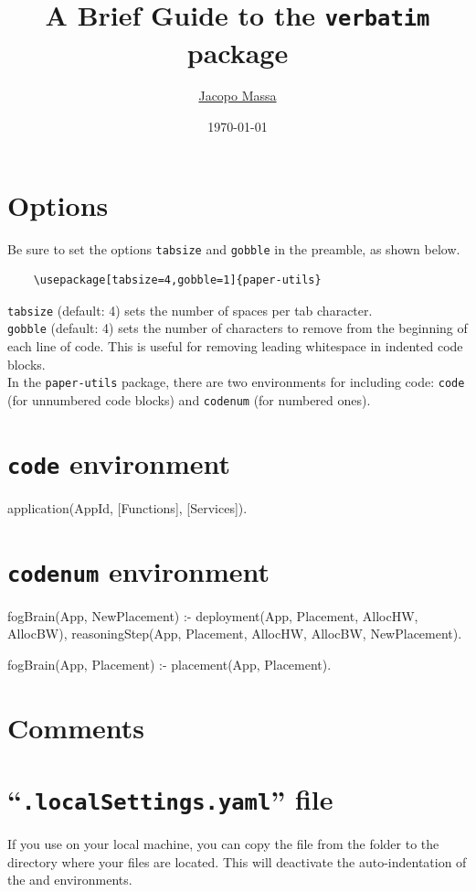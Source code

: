 \documentclass{article}
\title{A Brief Guide to the \texttt{verbatim} package}
\date{\today}
\author{\href{https://pages.di.unipi.it/massa}{Jacopo Massa}}
\begin{document}
\maketitle

\section*{Options}
Be sure to set the options \verb|tabsize| and \verb|gobble| in the preamble, as shown below.

\begin{Verbatim}
	\usepackage[tabsize=4,gobble=1]{paper-utils}
\end{Verbatim}

\noindent
\verb|tabsize| (default: 4) sets the number of spaces per tab character.\\
\verb|gobble| (default: 4) sets the number of characters to remove from the beginning of each line of code. This is useful for removing leading whitespace in indented code blocks.\\

\noindent In the \texttt{paper-utils} package, there are two environments for including code: \verb|code| (for unnumbered code blocks) and \verb|codenum| (for numbered ones).

\section*{\texttt{code} environment}
\begin{code}
    application(AppId, [Functions], [Services]).
\end{code}

\section*{\texttt{codenum} environment}
\begin{codenum}[firstnumber=1]
    fogBrain(App, NewPlacement) :-
        deployment(App, Placement, AllocHW, AllocBW),
        reasoningStep(App, Placement, AllocHW, AllocBW, NewPlacement).

    fogBrain(App, Placement) :-
        placement(App, Placement).
\end{codenum}

\section*{Comments}

\section*{``\texttt{.localSettings.yaml}'' file}

If you use  on your local machine, you can copy the  file from the  folder to the directory where your  files are located. This will deactivate the auto-indentation of the  and  environments.
\end{document}
